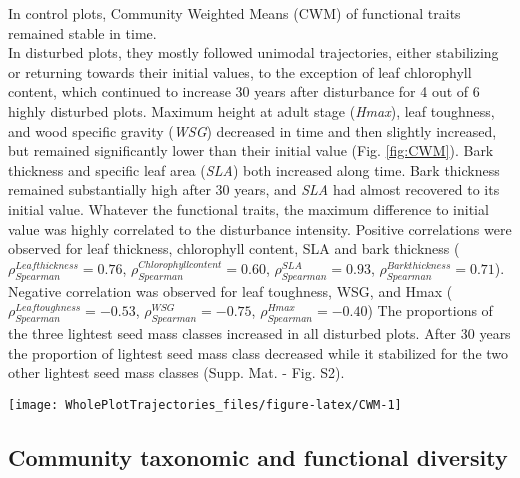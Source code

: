 \documentclass[fleqn,10pt]{ArtEcoFoG} %
\theoremstyle{definition}
\theoremstyle{definition}
\theoremstyle{definition}
\theoremstyle{remark}
\begin{document}
In control plots, Community Weighted Means (CWM) of functional traits
remained stable in time.\\
In disturbed plots, they mostly followed unimodal trajectories, either
stabilizing or returning towards their initial values, to the exception
of leaf chlorophyll content, which continued to increase 30 years after
disturbance for 4 out of 6 highly disturbed plots. Maximum height at
adult stage (\emph{Hmax}), leaf toughness, and wood specific gravity
(\emph{WSG}) decreased in time and then slightly increased, but remained
significantly lower than their initial value (Fig. \ref{fig:CWM}). Bark
thickness and specific leaf area (\emph{SLA}) both increased along time.
Bark thickness remained substantially high after 30 years, and
\emph{SLA} had almost recovered to its initial value. Whatever the
functional traits, the maximum difference to initial value was highly
correlated to the disturbance intensity. Positive correlations were
observed for leaf thickness, chlorophyll content, SLA and bark thickness
(\(\rho_{Spearman}^{Leaf thickness}=0.76\),
\(\rho_{Spearman}^{Chlorophyll content}=0.60\),
\(\rho_{Spearman}^{SLA}=0.93\),
\(\rho_{Spearman}^{Bark thickness}=0.71\)). Negative correlation was
observed for leaf toughness, WSG, and Hmax
(\(\rho_{Spearman}^{Leaf toughness}=-0.53\),
\(\rho_{Spearman}^{WSG}=-0.75\), \(\rho_{Spearman}^{Hmax}=-0.40\)) The
proportions of the three lightest seed mass classes increased in all
disturbed plots. After 30 years the proportion of lightest seed mass
class decreased while it stabilized for the two other lightest seed mass
classes (Supp. Mat. - Fig. S2).

\begin{figure*}

{\centering \texttt{[image: WholePlotTrajectories\_files/figure-latex/CWM-1]} 

}

\caption{Trajectories of community weighted means over 30 years after disturbance of four leaf traits (leaf thickness, chlorophyll content, toughness, and specific area), two stem traits (wood specific gravity and bark thickness), and one life history trait (species maximum height at adult stage). }\label{fig:CWM}
\end{figure*}

\subsection{Community taxonomic and functional
diversity}\label{community-taxonomic-and-functional-diversity}
\end{document}
